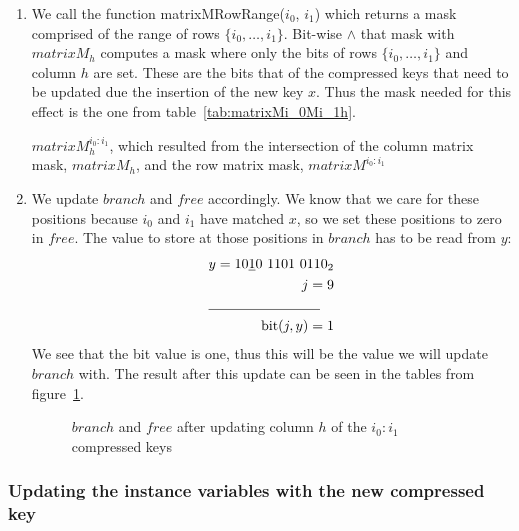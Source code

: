 \begin{enumerate}
    \item
    We call the function {\ttfamily matrixMRowRange($i_0$, $i_1$)} which returns a mask comprised of the range of rows $\{ i_0, \dots, i_1 \}$. Bit-wise $\wedge$ that mask with $matrixM_h$ computes a mask where only the bits of rows $\{ i_0, \dots, i_1 \}$ and column $h$ are set. These are the bits that of the compressed keys that need to be updated due the insertion of the new key $x$. Thus the mask needed for this effect is the one from table~\ref{tab:matrixMi_0Mi_1h}.
    \begin{table}[H]
    \centering
    
    \caption[Example of the intersection of column matrix mask, $matrixM_1$, with the row matrix mask $matrixM^{2:3}$, resulting in the mask $matrixM^{2:3}_1$]{$matrixM^{i_0:i_1}_h$, which resulted from the intersection of the column matrix mask, $matrixM_h$, and the row matrix mask, $matrixM^{i_0:i_1}$}
    \label{tab:matrixMi_0Mi_1h}
    \end{table}
    
    \item
    We update $branch$ and $free$ accordingly. We know that we care for these positions because $i_0$ and $i_1$ have matched $x$, so we set these positions to zero in $free$. The value to store at those positions in $branch$ has to be read from $y$:
    \begin{align*}
        y = 10\underline{1}0\ 1101\ 0110_2 \\
        j = 9 \\
        \cline{1-2}
        \text{bit}(j, y) = 1
    \end{align*}
    We see that the bit value is one, thus this will be the value we will update $branch$ with. The result after this update can be seen in the tables from figure~\ref{fig:branchAndFreeAfterMatrixMi_0Mi_1h}.
    \begin{figure}[H]
    \centering
    
    \caption[Example of $branch$ and $free$ after updating column $1$ in rows $2$ and $3$]{$branch$ and $free$ after updating column $h$ of the $i_0:i_1$ compressed keys}
    \label{fig:branchAndFreeAfterMatrixMi_0Mi_1h}
    \end{figure}
\end{enumerate}

\subsubsection{Updating the instance variables with the new compressed key} \label{sec:updateRankRow}

